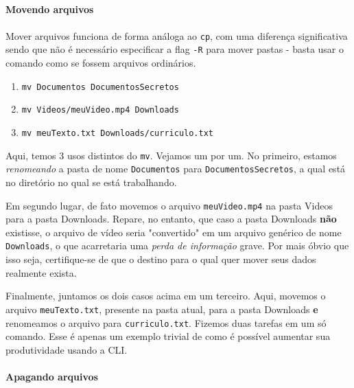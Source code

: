 \documentclass{article}
\begin{document}
	
	\paragraph{Movendo arquivos}
	\paragraph{}

	Mover arquivos funciona de forma análoga ao \texttt{cp}, com uma diferença significativa sendo que não é necessário 
	especificar a flag \texttt{-R} para mover pastas - basta usar o comando como se fossem arquivos ordinários. 

	\begin{enumerate} 
		\item{\texttt{mv Documentos DocumentosSecretos}} 
		\item{\texttt{mv Videos/meuVideo.mp4 Downloads}} 
		\item{\texttt{mv meuTexto.txt Downloads/curriculo.txt}} 
	\end{enumerate} 

	Aqui, temos 3 usos distintos do \texttt{mv}. Vejamos um por um. No primeiro, estamos \textit{renomeando} a pasta de 
	nome \texttt{Documentos} para \texttt{DocumentosSecretos}, a qual está no diretório no qual se está trabalhando. 


	Em segundo lugar, de fato movemos o arquivo \texttt{meuVideo.mp4} na pasta Videos para a pasta Downloads. Repare, no 
	entanto, que caso a pasta Downloads \textbf{não} existisse, o arquivo de vídeo seria "convertido" em um arquivo 
	genérico de nome \texttt{Downloads}, o que acarretaria uma \textit{perda de informação} grave. Por mais óbvio que isso
	seja, certifique-se de que o destino para o qual quer mover seus dados realmente exista. 


	Finalmente, juntamos os dois casos acima em um terceiro. Aqui, movemos o arquivo \texttt{meuTexto.txt}, presente na pasta
	atual, para a pasta Downloads \textbf{e} renomeamos o arquivo para \texttt{curriculo.txt}. Fizemos duas tarefas em um 
	só comando. Esse é apenas um exemplo trivial de como é possível aumentar sua produtividade usando a CLI. 
	
	\paragraph{Apagando arquivos} 
	\paragraph{} 
\end{document}
